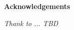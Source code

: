 \thispagestyle{empty}

\begin{center}
  {\bf \Huge Acknowledgements}
\end{center}

\vspace{4cm}
\emph{ Thank to ... TBD\\}